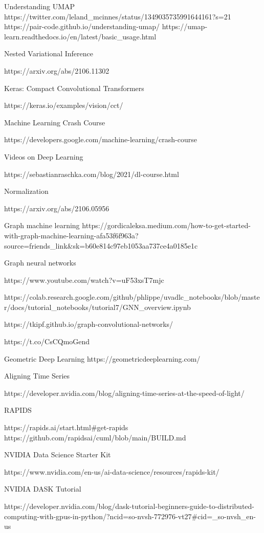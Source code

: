 Understanding UMAP
https://twitter.com/leland_mcinnes/status/1349035735991644161?s=21
https://pair-code.github.io/understanding-umap/
https://umap-learn.readthedocs.io/en/latest/basic_usage.html


Nested Variational Inference

https://arxiv.org/abs/2106.11302

Keras: Compact Convolutional Transformers

https://keras.io/examples/vision/cct/

Machine Learning Crash Course

https://developers.google.com/machine-learning/crash-course


Videos on Deep Learning

https://sebastianraschka.com/blog/2021/dl-course.html

Normalization 

https://arxiv.org/abs/2106.05956


Graph machine learning
https://gordicaleksa.medium.com/how-to-get-started-with-graph-machine-learning-afa53f6f963a?source=friends_link&sk=b60e814c97eb1053aa737ce4a0185e1c


Graph neural networks

https://www.youtube.com/watch?v=uF53xsT7mjc

https://colab.research.google.com/github/phlippe/uvadlc_notebooks/blob/master/docs/tutorial_notebooks/tutorial7/GNN_overview.ipynb

https://tkipf.github.io/graph-convolutional-networks/

https://t.co/CsCQmoGend



Geometric Deep Learning
https://geometricdeeplearning.com/




Aligning Time Series

https://developer.nvidia.com/blog/aligning-time-series-at-the-speed-of-light/

RAPIDS

https://rapids.ai/start.html#get-rapids
https://github.com/rapidsai/cuml/blob/main/BUILD.md

NVIDIA Data Science Starter Kit

https://www.nvidia.com/en-us/ai-data-science/resources/rapids-kit/


NVIDIA DASK Tutorial

https://developer.nvidia.com/blog/dask-tutorial-beginners-guide-to-distributed-computing-with-gpus-in-python/?ncid=so-nvsh-772976-vt27#cid=_so-nvsh_en-us

